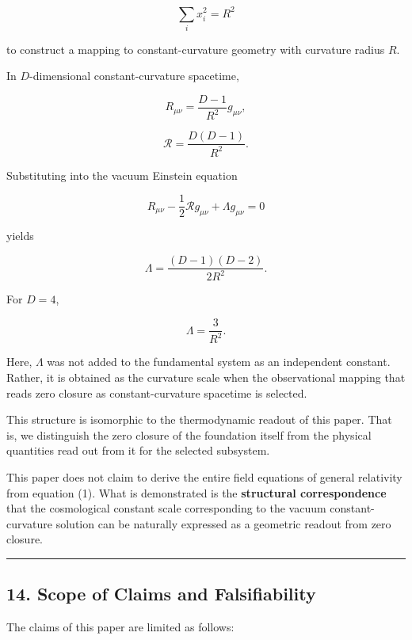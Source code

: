 \documentclass[
  a4paper,
]{article}
\begin{document}
\[
\sum_i x_i^2=R^2
\]

to construct a mapping to constant-curvature geometry with curvature
radius \(R\).

In \(D\)-dimensional constant-curvature spacetime,

\[
R_{\mu\nu}
=
\frac{D-1}{R^2}g_{\mu\nu},
\]

\[
\mathcal{R}
=
\frac{D(D-1)}{R^2}.
\]

Substituting into the vacuum Einstein equation

\[
R_{\mu\nu}
-\frac{1}{2}\mathcal{R}g_{\mu\nu}
+\Lambda g_{\mu\nu}
=
0
\]

yields

\[
\Lambda
=
\frac{(D-1)(D-2)}{2R^2}.
\tag{25}
\]

For \(D=4\),

\[
\Lambda
=
\frac{3}{R^2}.
\tag{26}
\]

Here, \(\Lambda\) was not added to the fundamental system as an
independent constant. Rather, it is obtained as the curvature scale when
the observational mapping that reads zero closure as constant-curvature
spacetime is selected.

This structure is isomorphic to the thermodynamic readout of this paper.
That is, we distinguish the zero closure of the foundation itself from
the physical quantities read out from it for the selected subsystem.

This paper does not claim to derive the entire field equations of
general relativity from equation (1). What is demonstrated is the
\textbf{structural correspondence} that the cosmological constant scale
corresponding to the vacuum constant-curvature solution can be naturally
expressed as a geometric readout from zero closure.

\begin{center}\rule{0.5\linewidth}{0.5pt}\end{center}

\subsection{14. Scope of Claims and
Falsifiability}\label{scope-of-claims-and-falsifiability}

The claims of this paper are limited as follows:
\end{document}

